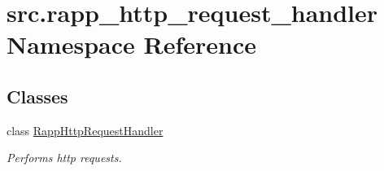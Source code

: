 \hypertarget{namespacesrc_1_1rapp__http__request__handler}{\section{src.\-rapp\-\_\-http\-\_\-request\-\_\-handler Namespace Reference}
\label{namespacesrc_1_1rapp__http__request__handler}
}
\subsection*{Classes}
\begin{DoxyCompactItemize}
\item 
class \hyperlink{classsrc_1_1rapp__http__request__handler_1_1RappHttpRequestHandler}{Rapp\-Http\-Request\-Handler}
\begin{DoxyCompactList}\small\item\em Performs http requests. \end{DoxyCompactList}\end{DoxyCompactItemize}
